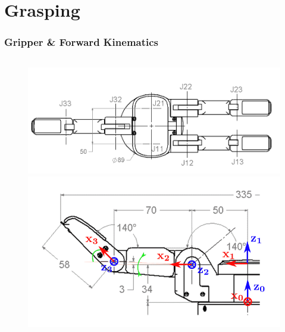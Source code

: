 \section{Grasping}

\begin{frame}
\frametitle{Gripper \& Forward Kinematics}
\begin{columns}
\begin{center}
\begin{figure}[!htb]
\centering
\includegraphics[width=\textwidth]{../images/bh8-282-top-only.png}\\
\includegraphics[width=\textwidth]{../images/bh8-282-generalized-finger-fwd-kin.png}\\
\end{figure}
\end{center}


\end{columns}
\end{frame}
